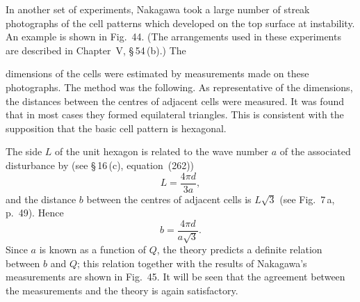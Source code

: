 
In another set of experiments, Nakagawa took a large number of streak photographs of the cell patterns which developed on the top surface at instability. An example is shown in Fig.~44. (The arrangements used in these experiments are described in Chapter~V, \S\,54\,(b).) The


dimensions of the cells were estimated by measurements made on these photographs. The method was the following. As representative of the dimensions, the distances between the centres of adjacent cells were measured. It was found that in most cases they formed equilateral triangles. This is consistent with the supposition that the basic cell pattern is hexagonal.

The side $L$ of the unit hexagon is related to the wave number $a$ of the associated disturbance by (see \S\,16\,(c), equation~(262))
\begin{equation}
\label{eq:4-264}
L = \frac{4\pi d}{3a},
\end{equation}
and the distance $b$ between the centres of adjacent cells is $L\sqrt{3}$ (see Fig.~7\,a, p.~49). Hence
\begin{equation}
\label{eq:4-265}
b = \frac{4\pi d}{a\sqrt{3}}.
\end{equation}
Since $a$ is known as a function of $Q$, the theory predicts a definite relation between $b$ and $Q$; this relation together with the results of Nakagawa's measurements are shown in Fig.~45. It will be seen that the agreement between the measurements and the theory is again satisfactory.


